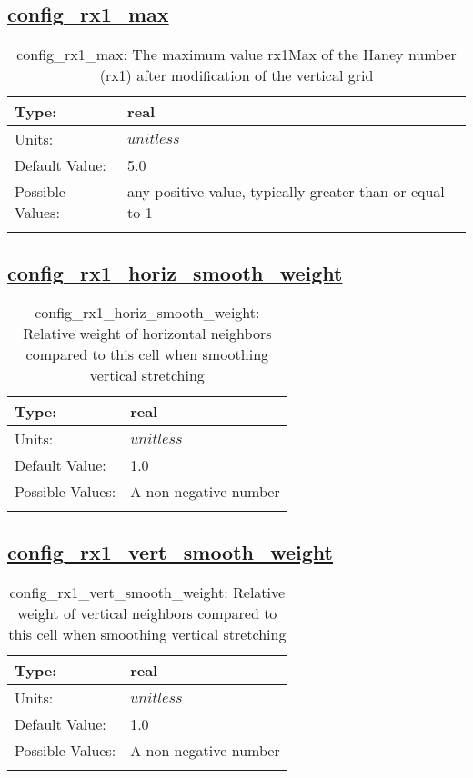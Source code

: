 \subsection[config\_rx1\_max]{\hyperref[sec:nm_tab_constrain_Haney_number]{config\_rx1\_max}}
\label{subsec:nm_sec_config_rx1_max}
\begin{center}
\begin{longtable}{| p{2.0in} || p{4.0in} |}
    \hline
    Type: & real \\
    \hline
    Units: & $unitless$ \\
    \hline
    Default Value: & 5.0 \\
    \hline
    Possible Values: & any positive value, typically greater than or equal to 1 \\
    \hline
    \caption{config\_rx1\_max: The maximum value rx1Max of the Haney number (rx1) after modification of the vertical grid}
\end{longtable}
\end{center}
\subsection[config\_rx1\_horiz\_smooth\_weight]{\hyperref[sec:nm_tab_constrain_Haney_number]{config\_rx1\_horiz\_smooth\_weight}}
\label{subsec:nm_sec_config_rx1_horiz_smooth_weight}
\begin{center}
\begin{longtable}{| p{2.0in} || p{4.0in} |}
    \hline
    Type: & real \\
    \hline
    Units: & $unitless$ \\
    \hline
    Default Value: & 1.0 \\
    \hline
    Possible Values: & A non-negative number \\
    \hline
    \caption{config\_rx1\_horiz\_smooth\_weight: Relative weight of horizontal neighbors compared to this cell when smoothing vertical stretching}
\end{longtable}
\end{center}
\subsection[config\_rx1\_vert\_smooth\_weight]{\hyperref[sec:nm_tab_constrain_Haney_number]{config\_rx1\_vert\_smooth\_weight}}
\label{subsec:nm_sec_config_rx1_vert_smooth_weight}
\begin{center}
\begin{longtable}{| p{2.0in} || p{4.0in} |}
    \hline
    Type: & real \\
    \hline
    Units: & $unitless$ \\
    \hline
    Default Value: & 1.0 \\
    \hline
    Possible Values: & A non-negative number \\
    \hline
    \caption{config\_rx1\_vert\_smooth\_weight: Relative weight of vertical neighbors compared to this cell when smoothing vertical stretching}
\end{longtable}
\end{center}
